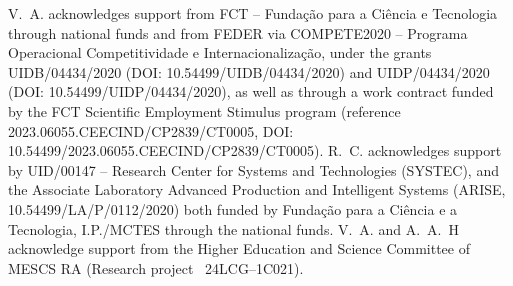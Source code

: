 \documentclass{aa}
\begin{document}
\begin{acknowledgements}
V.~A. acknowledges support from FCT – Funda\c{c}\~ao para a Ci\^encia e Tecnologia through national funds and from FEDER via COMPETE2020 – Programa Operacional Competitividade e Internacionalização, under the grants UIDB/04434/2020 (DOI: 10.54499/UIDB/04434/2020) and UIDP/04434/2020 (DOI: 10.54499/UIDP/04434/2020), as well as through a work contract funded by the FCT Scientific Employment Stimulus program (reference 2023.06055.CEECIND/CP2839/CT0005, DOI: 10.54499/2023.06055.CEECIND/CP2839/CT0005). R.~C. acknowledges support by UID/00147 -- Research Center for Systems and Technologies (SYSTEC), and the Associate Laboratory Advanced Production and Intelligent Systems (ARISE, 10.54499/LA/P/0112/2020) both funded by Fundação para a Ciência e a Tecnologia, I.P./MCTES through the national funds. V.~A. and A.~A.~H acknowledge support from the Higher Education and Science Committee of MESCS RA (Research project \textnumero~24LCG--1C021).
\end{acknowledgements}




%
\end{document}
